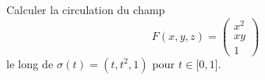 
\begin{exercice}\label{exoOutilsMath-0064}

    Calculer la circulation du champ
    \begin{equation}
        F(x,y,z)=\begin{pmatrix}
            x^2    \\ 
            xy    \\ 
            1    
        \end{pmatrix}
    \end{equation}
    le long de $\sigma(t)=(t,t^2,1)$ pour $t\in\mathopen[ 0 , 1 \mathclose]$.

\end{exercice}
